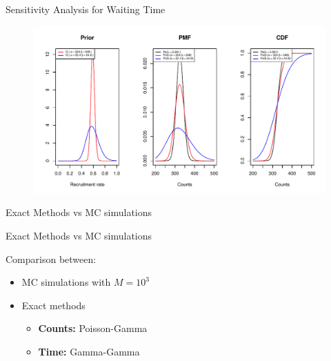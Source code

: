 \documentclass[english]{beamer}\usepackage[]{graphicx}\usepackage[]{xcolor}
\makeatletter
\def\maxwidth{ %
  \ifdim\Gin@nat@width>\linewidth
    \linewidth
  \else
    \Gin@nat@width
  \fi
}
\newenvironment{knitrout}{}{} %
\makeatother
\begin{document}
\begin{frame}{Sensitivity Analysis for Waiting Time}

\begin{figure}
\centering
\begin{knitrout}
\color{fgcolor}
\includegraphics[width=\maxwidth]{figures/figunnamed-chunk-12-1} 
\end{knitrout}
\end{figure}
\end{frame}

\begin{frame}{Exact Methods vs MC simulations}

\end{frame}

\begin{frame}{Exact Methods vs MC simulations}

Comparison between:
\begin{itemize}[label = ]
\item MC simulations with $M=10^3$ \citep{carter2004application}
\item Exact methods
\begin{itemize}[label = ]
\item \textbf{Counts:} Poisson-Gamma
\item \textbf{Time:} Gamma-Gamma
\end{itemize}
\end{itemize}

\end{frame}
\end{document}
